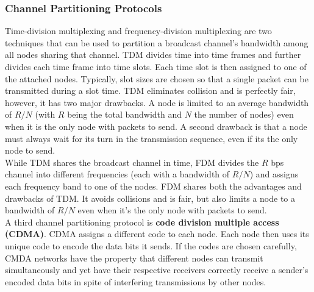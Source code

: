 \subsubsection{Channel Partitioning Protocols}
Time-division multiplexing and frequency-division multiplexing are two techniques that can be used to partition a broadcast channel's bandwidth among all nodes sharing that channel. TDM divides time into time frames and further divides each time frame into time slots. Each time slot is then assigned to one of the attached nodes. Typically, slot sizes are chosen so that a single packet can be transmitted during a slot time. TDM eliminates collision and is perfectly fair, however, it has two major drawbacks. A node is limited to an average bandwidth of $R/N$ (with $R$ being the total bandwidth and $N$ the number of nodes) even when it is the only node with packets to send. A second drawback is that a node must always wait for its turn in the transmission sequence, even if its the only node to send.\\
While TDM shares the broadcast channel in time, FDM divides the $R$ bps channel into different frequencies (each with a bandwidth of $R/N$) and assigns each frequency band to one of the nodes. FDM shares both the advantages and drawbacks of TDM. It avoids collisions and is fair, but also limits a node to a bandwidth of $R/N$ even when it's the only node with packets to send.\\
A third channel partitioning protocol is \textbf{code division multiple access (CDMA)}. CDMA assigns a different code to each node. Each node then uses its unique code to encode the data bits it sends. If the codes are chosen carefully, CMDA networks have the property that different nodes can transmit simultaneously and yet have their respective receivers correctly receive a sender's encoded data bits in spite of interfering transmissions by other nodes.

